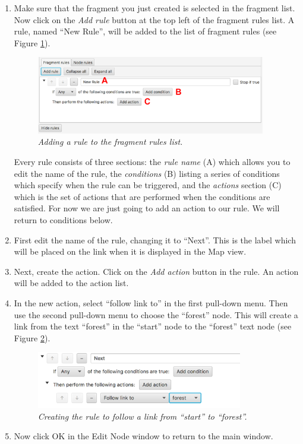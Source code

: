 \documentclass{article}
\begin{document}
\begin{enumerate}
\item Make sure that the fragment you just created is selected in the fragment list. Now click on the \textit{Add rule} button at the top left of the fragment rules list. A rule, named ``New Rule'', will be added to the list of fragment rules (see Figure \ref{fig:tut1:new_rule}).

\begin{figure}[ht]
  \centering
  \includegraphics[width=10cm]{images/hypedyn-tutorial-1-figure-8b}
  \caption{\textit{Adding a rule to the fragment rules list.}}
  \label{fig:tut1:new_rule}
\end{figure} 

Every rule consists of three sections: the \textit{rule name} (A) which allows you to edit the name of the rule, the \textit{conditions} (B)
listing a series of conditions which specify when the rule can be triggered, and the \textit{actions} section (C) which is the set of actions that are performed when the conditions are satisfied. For now we are just going to add an action to our rule. We will return to conditions below.

\item First edit the name of the rule, changing it to ``Next''. This is the label which will be placed on the link when it is displayed in the Map view.

\item Next, create the action. Click on the \textit{Add action} button in the rule. An action will be added to the action list.

\item In the new action, select ``follow link to'' in the first pull-down menu. Then use the second pull-down menu to choose the ``forest'' node. This will create a link from the text ``forest'' in the ``start'' node to the ``forest'' text node (see Figure \ref{fig:tut1:create_action}).

\begin{figure}[ht]
  \centering
  \includegraphics[width=9cm]{images/hypedyn-tutorial-1-figure-8d}
  \caption{\textit{Creating the rule to follow a link from ``start'' to
  ``forest''.}}
  \label{fig:tut1:create_action}
\end{figure} 

\item Now click OK in the Edit Node window to return to the main window.
\end{enumerate}
\end{document}
